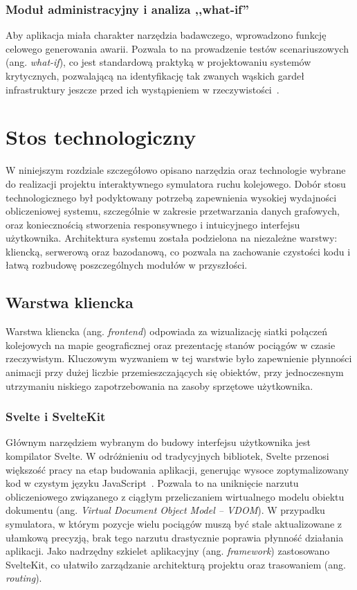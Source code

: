 \documentclass[twoside]{projektInzynierskiMS1z}
\begin{document}
\subsubsection{Moduł administracyjny i analiza ,,what-if''}

Aby aplikacja miała charakter narzędzia badawczego, wprowadzono funkcję celowego
generowania awarii. Pozwala to na prowadzenie testów scenariuszowych (ang.
\emph{what-if}), co jest standardową praktyką w projektowaniu systemów krytycznych,
pozwalającą na identyfikację tak zwanych wąskich gardeł infrastruktury jeszcze przed
ich wystąpieniem w rzeczywistości~\cite{sommerville2016}.

\section{Stos technologiczny}

W niniejszym rozdziale szczegółowo opisano narzędzia oraz technologie wybrane do
realizacji projektu interaktywnego symulatora ruchu kolejowego. Dobór stosu
technologicznego był podyktowany potrzebą zapewnienia wysokiej wydajności obliczeniowej
systemu, szczególnie w zakresie przetwarzania danych grafowych, oraz koniecznością
stworzenia responsywnego i intuicyjnego interfejsu użytkownika. Architektura systemu
została podzielona na niezależne warstwy: kliencką, serwerową oraz bazodanową, co
pozwala na zachowanie czystości kodu i łatwą rozbudowę poszczególnych modułów
w przyszłości.

\subsection{Warstwa kliencka}

Warstwa kliencka (ang. \emph{frontend}) odpowiada za wizualizację siatki połączeń
kolejowych na mapie geograficznej oraz prezentację stanów pociągów w czasie
rzeczywistym. Kluczowym wyzwaniem w tej warstwie było zapewnienie płynności animacji
przy dużej liczbie przemieszczających się obiektów, przy jednoczesnym utrzymaniu
niskiego zapotrzebowania na zasoby sprzętowe użytkownika.

\subsubsection{Svelte i SvelteKit}

Głównym narzędziem wybranym do budowy interfejsu użytkownika jest kompilator Svelte.
W odróżnieniu od tradycyjnych bibliotek, Svelte przenosi większość pracy na etap
budowania aplikacji, generując wysoce zoptymalizowany kod w czystym języku
JavaScript~\cite{svelte}. Pozwala to na uniknięcie narzutu obliczeniowego związanego
z ciągłym przeliczaniem wirtualnego modelu obiektu dokumentu (ang. \emph{Virtual
Document Object Model -- VDOM}). W przypadku symulatora, w którym pozycje wielu
pociągów muszą być stale aktualizowane z ułamkową precyzją, brak tego narzutu
drastycznie poprawia płynność działania aplikacji. Jako nadrzędny szkielet
aplikacyjny (ang. \emph{framework}) zastosowano SvelteKit, co ułatwiło zarządzanie
architekturą projektu oraz trasowaniem (ang. \emph{routing}).
\end{document}
